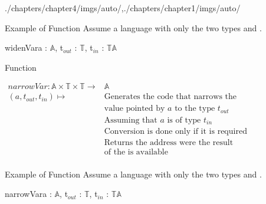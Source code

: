 \begin{graphicspathcontext}{{./chapters/chapter4/imgs/auto/},{./chapters/chapter1/imgs/auto/}}
\begin{bibunit}[apalike]
\begin{frame}{Example of Function }
	Assume a language with only the two types  and . \\
	\vspace{1em}
	\begin{myfunction}{widenVar}{a : $\mathbb{A}$, t$_{out}$ : $\mathbb{T}$, t$_{in}$ : $\mathbb{T}$}{$\mathbb{A}$}
	\end{myfunction}
\end{frame}

\begin{frame}{Function }
	\begin{definition}
		$\begin{array}{rl}
			narrowVar : \mathbb{A} \times \mathbb{T} \times \mathbb{T} \rightarrow & \mathbb{A} \\
			(a, t_{out}, t_{in}) \mapsto & \text{Generates the code that narrows the} \\
			& \text{value pointed by }a\text{ to the type }t_{out} \\[.2cm]
			& \text{Assuming that }a\text{ is of type }t_{in} \\[.2cm]
			& \text{Conversion is done only if it is required} \\[.2cm]
			& \text{Returns the address were the result} \\
			& \text{of the is available} \\
		\end{array}$
	\end{definition}
\end{frame}

\begin{frame}{Example of Function }
	Assume a language with only the two types  and . \\
	\vspace{1em}
	\begin{myfunction}{narrowVar}{a : $\mathbb{A}$, t$_{out}$ : $\mathbb{T}$, t$_{in}$ : $\mathbb{T}$}{$\mathbb{A}$}
	\end{myfunction}
\end{frame}


\end{bibunit}
\end{graphicspathcontext}
